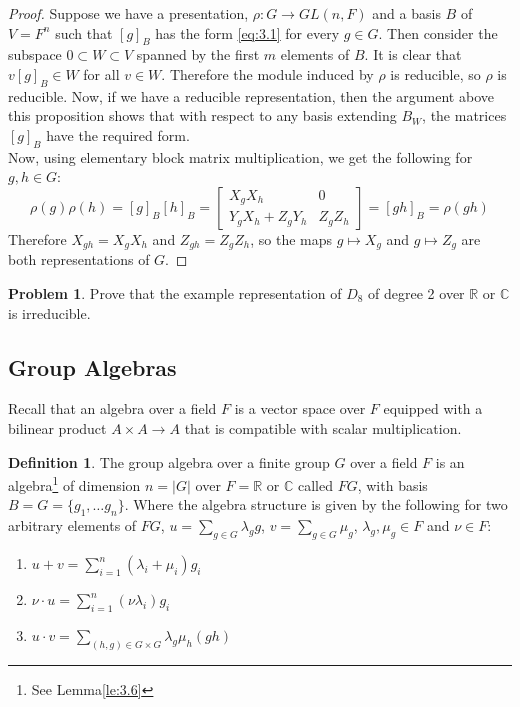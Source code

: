 \documentclass[11pt, notitlepage]{article}
\numberwithin{equation}{section}
\theoremstyle{plain}
\theoremstyle{definition}
\newtheorem{definition}[theorem]{Definition}
\newtheorem{problem}{Problem}
\newcommand{\R}{\mathbb{R}}
\newcommand{\C}{\mathbb{C}}
\begin{document}
\begin{proof}
	Suppose we have a presentation, $\rho:G\rightarrow GL(n,F)$ and a basis $B$ of $V = F^n$ such that $[g]_B$ has the form \ref{eq:3.1} for every $g\in G$. Then consider the subspace $0\subset W\subset V$ spanned by the first $m$ elements of $B$. It is clear that $v[g]_B\in W$ for all $v\in W$. Therefore the module induced by $\rho$ is reducible, so $\rho$ is reducible. Now, if we have a reducible representation, then the argument above this proposition shows that with respect to any basis extending $B_W$, the matrices $[g]_B$ have the required form.\\
	Now, using elementary block matrix multiplication, we get the following for $g,h\in G$: 
	\[\rho(g)\rho(h) = [g]_B[h]_B = \begin{bmatrix}
	X_gX_h & 0\\
	Y_gX_h+Z_gY_h & Z_gZ_h
	\end{bmatrix} = [gh]_B=\rho(gh)\]
	Therefore $X_{gh} = X_gX_h$ and $Z_{gh} = Z_gZ_h$, so the maps $g\mapsto X_g$ and $g\mapsto Z_g$ are both representations of $G$.
\end{proof}

\begin{problem}
	Prove that the example representation of $D_8$ of degree 2 over $\R$ or $\C$ is irreducible.
\end{problem}

\subsection{Group Algebras}

Recall that an algebra over a field $F$ is a  vector space over $F$ equipped with a bilinear product $A\times A\rightarrow A$ that is compatible with scalar multiplication.

\begin{definition}
	The group algebra over a finite group $G$ over a field $F$ is an algebra\footnote{See Lemma\ref{le:3.6} } of dimension $n = |G|$ over $F=\R$ or $\C$ called $FG$, with basis $B=G = \{g_1,\dots g_n\}$. Where the algebra structure is given by the following for two arbitrary elements of $FG$, $u = \sum_{g\in G}\lambda_gg$, $v = \sum_{g\in G}\mu_g$, $\lambda_g,\mu_g\in F$ and $\nu\in F$:
	\begin{enumerate}[label=(\roman*)]
		\item $u+v = \sum_{i=1}^n(\lambda_i+\mu_i)g_i$
		\item $\nu \cdot u = \sum_{i=1}^{n}(\nu\lambda_i)g_i$
		\item $u\cdot v = \sum_{(h,g)\in G\times G}\lambda_g\mu_h(gh)$
	\end{enumerate}
\end{definition}
\end{document}
